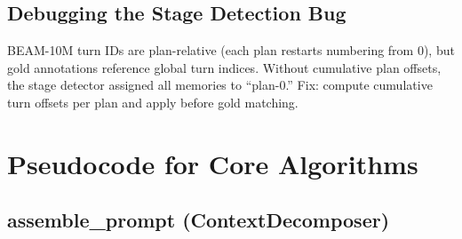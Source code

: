 \documentclass[11pt]{article}
\begin{document}
\subsection{Debugging the Stage Detection Bug}

BEAM-10M turn IDs are plan-relative (each plan restarts numbering
from 0), but gold annotations reference global turn indices.  Without
cumulative plan offsets, the stage detector assigned all memories to
``plan-0.''  Fix: compute cumulative turn offsets per plan and apply
before gold matching.

\section{Pseudocode for Core Algorithms}
\label{app:pseudocode}

\subsection{assemble\_prompt (ContextDecomposer)}
\end{document}
